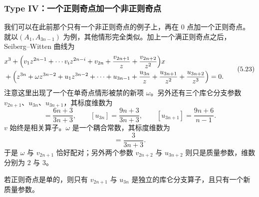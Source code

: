 \subsubsection{Type IV：一个正则奇点加一个非正则奇点}
\label{sec:5.1.4}

我们可以在此前那个只有一个非正则奇点的例子上，再在 $0$ 点加一个正则奇点。就以\allowbreak $(A_1,A_{3n-1})$ 为例，其他情形完全类似。加上一个满正则奇点之后，Seiberg--Witten 曲线为
\begin{equation}
\begin{aligned}
& x^3 + \Bigl(v_1z^{2n-1} + \cdots v_iz^{2n-i} + v_{2n} + \frac{v_{2n+1}}{z} + \frac{v_{2n+2}}{z^2}\Bigr)x\\
& + \Bigl(z^{3n} + \omega z^{3n-2} + u_1z^{3n-2} + \cdots + u_{3n-1} + \frac{u_{3n}}{z} + \frac{u_{3n+1}}{z^2} + \frac{u_{3n+2}}{z^3}\Bigr) = 0 .
\end{aligned}
\label{eq:5.23}\tag{5.23}
\end{equation}
注意这里出现了一个在单奇点情形被禁的新项 $\omega$。另外还有三个库仑分支参数 $v_{2n+1}$、$u_{3n}$、$u_{3n+1}$，其标度维数为
\begin{equation}
[v_{2n+1}] = \frac{6n+3}{3n+3},\qquad
[u_{3n}] = \frac{9n+3}{3n+3},\qquad
[u_{3n+1}] = \frac{9n+6}{n-1}.
\label{eq:5.24}\tag{5.24}
\end{equation}
$v$ 始终是相关算子。$\omega$ 是一个耦合常数，其标度维数为
\begin{equation}
[\omega] = \frac{3}{3n+3}.
\label{eq:5.25}\tag{5.25}
\end{equation}
于是 $\omega$ 与 $v_{2n+1}$ 恰好配对；另外两个参数 $v_{2n+2}$ 与 $u_{3n+2}$ 则只是质量参数，维数分别为 $2$ 与 $3$。



若正则奇点是单的，则只有 $v_{2n+1}$ 与 $u_{3n}$ 是独立的库仑分支算子，且只有一个新质量参数。

